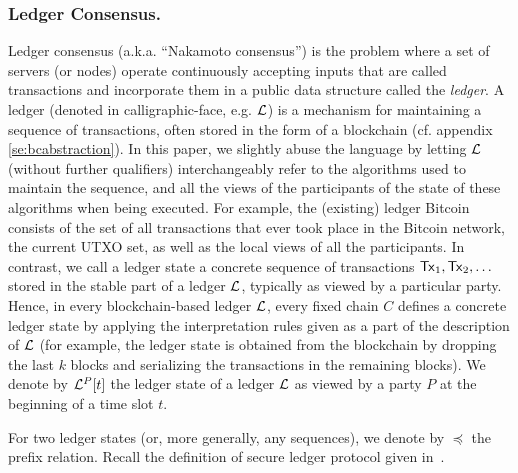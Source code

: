\subsubsection{Ledger Consensus.}
Ledger consensus (a.k.a. ``Nakamoto consensus'') is the problem where a set of servers
(or nodes) operate continuously accepting inputs
that are called transactions and incorporate them in a public data 
structure called the {\em ledger}. 
A ledger (denoted in calligraphic-face, e.g. $\mathcal{L}$) is a mechanism for maintaining a sequence of transactions, often
stored in the form of a blockchain (cf. appendix \ref{se:bcabstraction}). In this paper, we slightly abuse the language by letting $\mathcal{L}$ (without further
qualifiers) interchangeably refer to the algorithms used to maintain the sequence, and all the views of the
participants of the state of these algorithms when being executed. For example, the (existing) ledger Bitcoin
consists of the set of all transactions that ever took place in the Bitcoin network, the current UTXO set, as
well as the local views of all the participants.
In contrast, we call a ledger state a concrete sequence of transactions $\mathsf{Tx}_1,\mathsf{Tx}_2,\dots$ stored in the stable
part of a ledger $\mathcal{L}$, typically as viewed by a particular party. Hence, in every blockchain-based ledger $\mathcal{L}$,
every fixed chain $C$ defines a concrete ledger state by applying the interpretation rules given as a part of the
description of $\mathcal{L}$ %
(for example, the ledger state is obtained from the blockchain by dropping the last $k$ blocks
and serializing the transactions in the remaining blocks). We denote by $\mathcal{L}^P[t]$
the ledger state of a ledger $\mathcal{L}$ as viewed by a party $P$ at the beginning of a time slot $t$.


For two ledger states (or, more generally, any sequences), we denote by $\preceq$ the prefix relation.
Recall the definition of secure ledger protocol given in~\cite{sok}.


